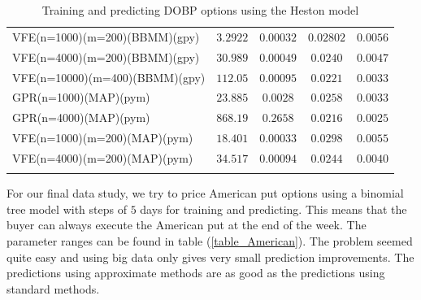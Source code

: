 \documentclass[12pt,a4paper,oneside]{book}
\begin{document}
\begin{table}
\begin{tabular}[t]{lcccc}
VFE(n=1000)(m=200)(BBMM)(gpy)  & $3.2922$ & $\bm{0.00032}$     & $0.02802$ &    $0.0056$ \\\addlinespace
VFE(n=4000)(m=200)(BBMM)(gpy)  & $30.989$ & $ 0.00049$    & $0.0240$ &    $0.0047$ \\\addlinespace
VFE(n=10000)(m=400)(BBMM)(gpy)  & $112.05$ &  $0.00095$  & $0.0221$ & $0.0033$  \\\addlinespace
GPR(n=1000)(MAP)(pym)  & $23.885$  &  $0.0028$   & $0.0258$ & $0.0033$  \\\addlinespace
GPR(n=4000)(MAP)(pym)  & $868.19$ & $0.2658$    & $\bm{0.0216}$ & $\bm{0.0025}$   \\\addlinespace
VFE(n=1000)(m=200)(MAP)(pym)  & $18.401$ & $0.00033$    & $0.0298$  &   $ 0.0055$ \\\addlinespace
VFE(n=4000)(m=200)(MAP)(pym)  & $34.517$ &  $0.00094$   & $0.0244$ &     $0.0040$ \\\addlinespace
\\\bottomrule
\end{tabular}
\caption{Training and predicting DOBP options using the Heston model}\label{dobp_outcomes}
\end{table}



For our final data study, we try to price American put options using a binomial tree model with steps of $5$ days for training and predicting. This means that the buyer can always execute the American put at the end of the week. The parameter ranges can be found in table (\ref{table_American}). The problem seemed quite easy and using big data only gives very small prediction improvements. The predictions using approximate methods are as good as the predictions using standard methods.
\end{document}
